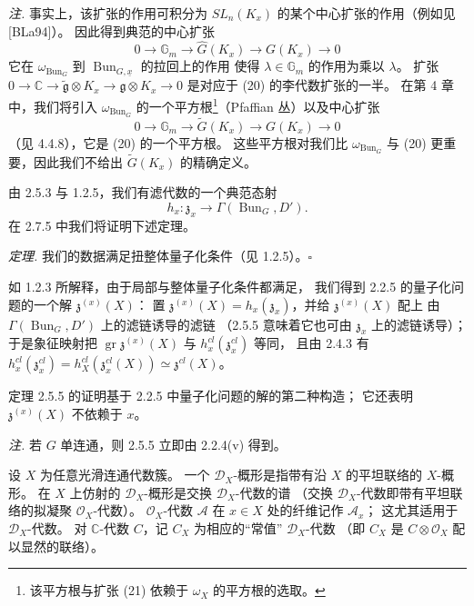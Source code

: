 \emph{注.} 事实上，该扩张的作用可积分为 $SL_n(K_x)$ 的某个中心扩张的作用（例如见 [BLa94]）。
因此得到典范的中心扩张
\begin{equation}\tag{20}
0\to\mathbb{G}_m\to\hat{G}(K_x)\to G(K_x)\to 0
\end{equation}
它在 $\omega_{\operatorname{Bun}_G}$ 到 $\operatorname{Bun}_{G,\underline{x}}$ 的拉回上的作用
使得 $\lambda\in\mathbb{G}_m$ 的作用为乘以 $\lambda$。
扩张 $0\to\mathbb{C}\to\tilde{\mathfrak{g}}\otimes K_x\to\mathfrak{g}\otimes K_x\to 0$
是对应于 (20) 的李代数扩张的一半。
在第 4 章中，我们将引入 $\omega_{\operatorname{Bun}_G}$ 的一个平方根\footnote{该平方根与扩张 (21) 依赖于 $\omega_X$ 的平方根的选取。}（Pfaffian 丛）以及中心扩张
\begin{equation}\tag{21}
0\to\mathbb{G}_m\to\tilde{G}(K_x)\to G(K_x)\to 0
\end{equation}
（见 4.4.8），它是 (20) 的一个平方根。
这些平方根对我们比 $\omega_{\operatorname{Bun}_G}$ 与 (20) 更重要，因此我们不给出 $\tilde{G}(K_x)$ 的精确定义。

 由 2.5.3 与 1.2.5，我们有滤代数的一个典范态射
\[
h_x: \mathfrak{z}_x\to\Gamma(\operatorname{Bun}_G,D').
\]
在 2.7.5 中我们将证明下述定理。

\emph{定理.} 我们的数据满足扭整体量子化条件（见 1.2.5）。\hfill$\square$

如 1.2.3 所解释，由于局部与整体量子化条件都满足，
我们得到 2.2.5 的量子化问题的一个解 $\mathfrak{z}^{(x)}(X)$：
置 $\mathfrak{z}^{(x)}(X)=h_x(\mathfrak{z}_x)$，并给 $\mathfrak{z}^{(x)}(X)$ 配上
由 $\Gamma(\operatorname{Bun}_G,D')$ 上的滤链诱导的滤链
（2.5.5 意味着它也可由 $\mathfrak{z}_x$ 上的滤链诱导）；
于是象征映射把 $\operatorname{gr}\mathfrak{z}^{(x)}(X)$ 与 $h_x^{cl}(\mathfrak{z}^{cl}_x)$ 等同，
且由 2.4.3 有
$h_x^{cl}(\mathfrak{z}^{cl}_x)=h_X^{cl}(\mathfrak{z}^{cl}_x(X))\simeq\mathfrak{z}^{cl}(X)$。

定理 2.5.5 的证明基于 2.2.5 中量子化问题的解的第二种构造；
它还表明 $\mathfrak{z}^{(x)}(X)$ 不依赖于 $x$。

\emph{注.} 若 $G$ 单连通，则 2.5.5 立即由 2.2.4(v) 得到。


 设 $X$ 为任意光滑连通代数簇。
一个 $\mathcal{D}_X$-概形是指带有沿 $X$ 的平坦联络的 $X$-概形。
在 $X$ 上仿射的 $\mathcal{D}_X$-概形是交换 $\mathcal{D}_X$-代数的谱
（交换 $\mathcal{D}_X$-代数即带有平坦联络的拟凝聚 $\mathcal{O}_X$-代数）。
$\mathcal{O}_X$-代数 $\mathcal{A}$ 在 $x\in X$ 处的纤维记作 $\mathcal{A}_x$；
这尤其适用于 $\mathcal{D}_X$-代数。
对 $\mathbb{C}$-代数 $C$，记 $C_X$ 为相应的“常值” $\mathcal{D}_X$-代数
（即 $C_X$ 是 $C\otimes\mathcal{O}_X$ 配以显然的联络）。

